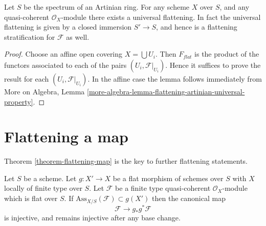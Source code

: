 \begin{lemma}
\label{lemma-flattening-stratification-artinian}
Let $S$ be the spectrum of an Artinian ring.
For any scheme $X$ over $S$, and any quasi-coherent $\mathcal{O}_X$-module
there exists a universal flattening. In fact the universal flattening
is given by a closed immersion $S' \to S$, and hence is a flattening
stratification for $\mathcal{F}$ as well.
\end{lemma}

\begin{proof}
Choose an affine open covering $X = \bigcup U_i$.
Then $F_{flat}$ is the product of the functors associated to
each of the pairs $(U_i, \mathcal{F}|_{U_i})$.
Hence it suffices to prove the result for each
$(U_i, \mathcal{F}|_{U_i})$.
In the affine case the lemma follows immediately from
More on Algebra,
Lemma \ref{more-algebra-lemma-flattening-artinian-universal-property}.
\end{proof}






\section{Flattening a map}
\label{section-flattening-map}

\noindent
Theorem \ref{theorem-flattening-map}
is the key to further flattening statements.

\begin{lemma}
\label{lemma-universally-separating}
Let $S$ be a scheme.
Let $g : X' \to X$ be a flat morphism of schemes over $S$
with $X$ locally of finite type over $S$.
Let $\mathcal{F}$ be a finite type quasi-coherent $\mathcal{O}_X$-module
which is flat over $S$. If $\text{Ass}_{X/S}(\mathcal{F}) \subset g(X')$
then the canonical map
$$
\mathcal{F} \longrightarrow g_*g^*\mathcal{F}
$$
is injective, and remains injective after any base change.
\end{lemma}

